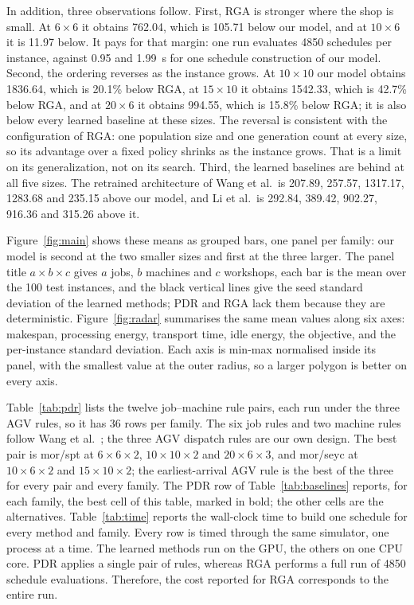 In addition, three observations follow. First, RGA is stronger where the shop is small. At
$6\times6$ it obtains 762.04, which is 105.71 below our model, and at
$10\times6$ it is 11.97 below. It pays for that margin: one run evaluates 4850
schedules per instance, against 0.95 and 1.99~s for one schedule construction of our model.
Second, the ordering reverses as the instance grows. At
$10\times10$ our model obtains 1836.64, which is 20.1\% below RGA, at
$15\times10$ it obtains 1542.33, which is 42.7\% below RGA, and at
$20\times6$ it obtains 994.55, which is 15.8\% below RGA; it is also
below every learned baseline at these sizes. The reversal is consistent with the
configuration of RGA: one population size and one generation count at every
size, so its advantage over a fixed policy shrinks as the instance grows. That
is a limit on its generalization, not on its search. Third, the learned baselines are behind
at all five sizes. The retrained architecture of Wang et al.\ is 207.89, 257.57,
1317.17, 1283.68 and 235.15 above our model, and Li et al.\ is 292.84, 389.42, 902.27,
916.36 and 315.26 above it.

Figure~\ref{fig:main} shows these means as grouped bars, one panel per
family: our model is second at the two smaller sizes and first at the three
larger. The panel title $a\times b\times c$ gives $a$ jobs, $b$ machines and
$c$ workshops, each bar is the mean over the 100 test instances, and the black
vertical lines give the seed standard deviation of the learned methods; PDR
and RGA lack them because they are deterministic. Figure~\ref{fig:radar}
summarises the same mean values along six axes: makespan, processing energy, transport time, idle energy, 
the objective, and the per-instance standard deviation. Each axis is min-max normalised inside its panel, 
with the smallest value at the outer radius, so a larger polygon is better on every axis.

Table~\ref{tab:pdr} lists the twelve job--machine rule pairs, each run under
the three AGV rules, so it has 36 rows per family. The six job rules and two
machine rules follow Wang et al.~\cite{wang2025multitarget}; the three AGV
dispatch rules are our own design. The best pair is mor/spt at
$6\times6\times2$, $10\times10\times2$ and $20\times6\times3$, and mor/seyc at
$10\times6\times2$ and $15\times10\times2$; the earliest-arrival AGV rule is
the best of the three for every pair and every family. The PDR row of
Table~\ref{tab:baselines} reports, for each family, the best cell of this
table, marked in bold; the other cells are the alternatives.
Table~\ref{tab:time} reports the wall-clock time to
build one schedule for every method and family. Every row is timed through the same simulator, one process at a time. 
The learned methods run on the GPU, the others on one CPU core. 
PDR applies a single pair of rules, whereas RGA performs a full run of 4850 schedule evaluations. 
Therefore, the cost reported for RGA corresponds to the entire run.

